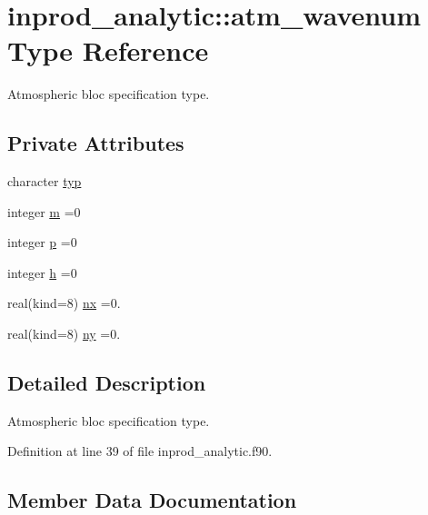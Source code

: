 \hypertarget{structinprod__analytic_1_1atm__wavenum}{}\section{inprod\+\_\+analytic\+:\+:atm\+\_\+wavenum Type Reference}
\label{structinprod__analytic_1_1atm__wavenum}


Atmospheric bloc specification type.  


\subsection*{Private Attributes}
\begin{DoxyCompactItemize}
\item 
character \hyperlink{structinprod__analytic_1_1atm__wavenum_a1c12be211e96c5a773aae4c2146a3792}{typ}
\item 
integer \hyperlink{structinprod__analytic_1_1atm__wavenum_a72be0a86c5f5801b88ebf78506523bd2}{m} =0
\item 
integer \hyperlink{structinprod__analytic_1_1atm__wavenum_a5a938641d8939931bc4eb71499298a6a}{p} =0
\item 
integer \hyperlink{structinprod__analytic_1_1atm__wavenum_aa7df1690e97e43365ca0c2b1222924b5}{h} =0
\item 
real(kind=8) \hyperlink{structinprod__analytic_1_1atm__wavenum_ad67bf9989f5524b1f97dc7211ef78db2}{nx} =0.
\item 
real(kind=8) \hyperlink{structinprod__analytic_1_1atm__wavenum_af75974631175c67689c588f6d92ceb3e}{ny} =0.
\end{DoxyCompactItemize}


\subsection{Detailed Description}
Atmospheric bloc specification type. 

Definition at line 39 of file inprod\+\_\+analytic.\+f90.



\subsection{Member Data Documentation}
